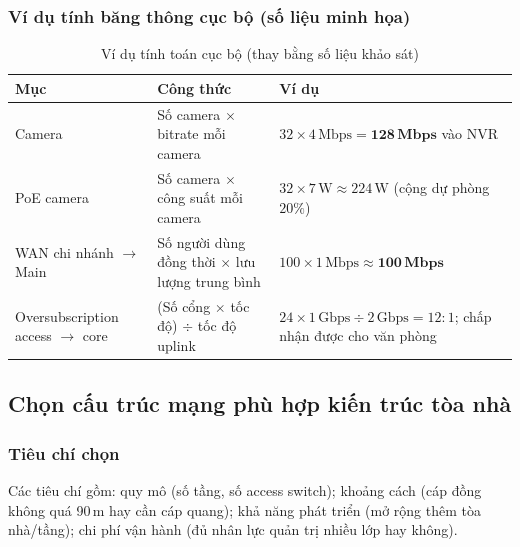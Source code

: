 \subsubsection{Ví dụ tính băng thông cục bộ (số liệu minh họa)}
\begin{small}
\setlength{\tabcolsep}{4pt}
\begin{longtable}{|p{3.4cm}|p{4.6cm}|p{5.6cm}|}
\caption{Ví dụ tính toán cục bộ (thay bằng số liệu khảo sát)} \label{tab:local_calc} \\
\hline
\textbf{Mục} & \textbf{Công thức} & \textbf{Ví dụ} \\ \hline
\endhead
Camera & Số camera $\times$ bitrate mỗi camera & $32 \times 4\,\text{Mbps} = \mathbf{128\,Mbps}$ vào NVR \\ \hline
PoE camera & Số camera $\times$ công suất mỗi camera & $32 \times 7\,\text{W} \approx 224\,\text{W}$ (cộng dự phòng $20\%$) \\ \hline
WAN chi nhánh $\to$ Main & Số người dùng đồng thời $\times$ lưu lượng trung bình & $100 \times 1\,\text{Mbps} \approx \mathbf{100\,Mbps}$ \\ \hline
Oversubscription access $\to$ core & (Số cổng $\times$ tốc độ) $\div$ tốc độ uplink & $24 \times 1\,\text{Gbps} \div 2\,\text{Gbps} = 12{:}1$; chấp nhận được cho văn phòng \\ \hline
\end{longtable}
\end{small}

\subsection{Chọn cấu trúc mạng phù hợp kiến trúc tòa nhà}
\label{sec:step1-structure}

\subsubsection{Tiêu chí chọn}
Các tiêu chí gồm: quy mô (số tầng, số access switch); khoảng cách (cáp đồng không quá 90\,m hay cần cáp quang); khả năng phát triển (mở rộng thêm tòa nhà/tầng); chi phí vận hành (đủ nhân lực quản trị nhiều lớp hay không).

